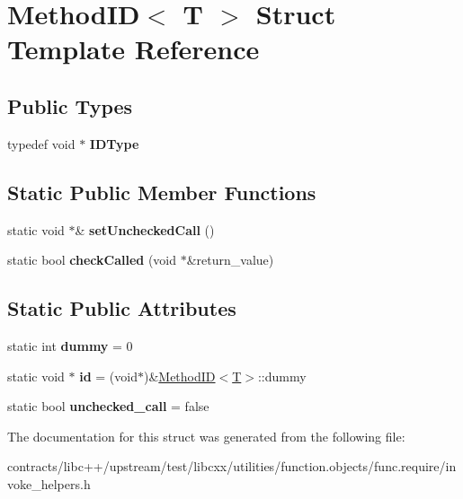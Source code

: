 \hypertarget{struct_method_i_d}{}\section{Method\+ID$<$ T $>$ Struct Template Reference}
\label{struct_method_i_d}
\subsection*{Public Types}
\begin{DoxyCompactItemize}
\item 
\mbox{\label{struct_method_i_d_aaabddfff39955638916fd060e679efef}} 
typedef void $\ast$ {\bfseries I\+D\+Type}
\end{DoxyCompactItemize}
\subsection*{Static Public Member Functions}
\begin{DoxyCompactItemize}
\item 
\mbox{\label{struct_method_i_d_a85fce8a53c0b0c1bf9783a251485c8a7}} 
static void $\ast$\& {\bfseries set\+Unchecked\+Call} ()
\item 
\mbox{\label{struct_method_i_d_a45df82927cbc2bfaf27887b05cda4f07}} 
static bool {\bfseries check\+Called} (void $\ast$\&return\+\_\+value)
\end{DoxyCompactItemize}
\subsection*{Static Public Attributes}
\begin{DoxyCompactItemize}
\item 
\mbox{\label{struct_method_i_d_a134def66770030c3e6cdfb3e8bc7549e}} 
static int {\bfseries dummy} = 0
\item 
\mbox{\label{struct_method_i_d_a4c4c3f9d1bab28a42b93daa8fe963a64}} 
static void $\ast$ {\bfseries id} = (void$\ast$)\&\mbox{\hyperlink{struct_method_i_d}{Method\+ID}}$<$\mbox{\hyperlink{struct_t}{T}}$>$\+::dummy
\item 
\mbox{\label{struct_method_i_d_a48f7c094d5301a032c36d04545542ea6}} 
static bool {\bfseries unchecked\+\_\+call} = false
\end{DoxyCompactItemize}


The documentation for this struct was generated from the following file\+:\begin{DoxyCompactItemize}
\item 
contracts/libc++/upstream/test/libcxx/utilities/function.\+objects/func.\+require/invoke\+\_\+helpers.\+h\end{DoxyCompactItemize}

